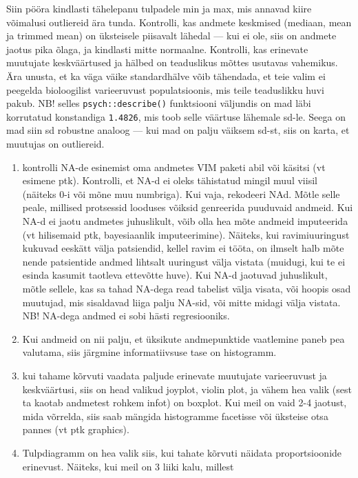 \documentclass[]{book}
\begin{document}
Siin pööra kindlasti tähelepanu tulpadele min ja max, mis annavad kiire
võimalusi outliereid ära tunda. Kontrolli, kas andmete keskmised
(mediaan, mean ja trimmed mean) on üksteisele piisavalt lähedal --- kui
ei ole, siis on andmete jaotus pika õlaga, ja kindlasti mitte normaalne.
Kontrolli, kas erinevate muutujate keskväärtused ja hälbed on
teaduslikus mõttes usutavas vahemikus. Ära unusta, et ka väga väike
standardhälve võib tähendada, et teie valim ei peegelda bioloogilist
varieeruvust populatsioonis, mis teile teaduslikku huvi pakub. NB!
selles \texttt{psych::describe()} funktsiooni väljundis on mad läbi
korrutatud konstandiga \texttt{1.4826}, mis toob selle väärtuse lähemale
sd-le. Seega on mad siin sd robustne analoog --- kui mad on palju
väiksem sd-st, siis on karta, et muutujas on outliereid.

\begin{enumerate}
\def\labelenumi{\arabic{enumi}.}
\setcounter{enumi}{2}
\item
  kontrolli NA-de esinemist oma andmetes VIM paketi abil või käsitsi (vt
  esimene ptk). Kontrolli, et NA-d ei oleks tähistatud mingil muul
  viisil (näiteks 0-i või mõne muu numbriga). Kui vaja, rekodeeri NAd.
  Mõtle selle peale, millised protsessid looduses võiksid genreerida
  puuduvaid andmeid. Kui NA-d ei jaotu andmetes juhuslikult, võib olla
  hea mõte andmeid imputeerida (vt hilisemaid ptk, bayesiaanlik
  imputeerimine). Näiteks, kui ravimiuuringust kukuvad eeskätt välja
  patsiendid, kellel ravim ei tööta, on ilmselt halb mõte nende
  patsientide andmed lihtsalt uuringust välja vistata (muidugi, kui te
  ei esinda kasumit taotleva ettevõtte huve). Kui NA-d jaotuvad
  juhuslikult, mõtle sellele, kas sa tahad NA-dega read tabelist välja
  visata, või hoopis osad muutujad, mis sisaldavad liiga palju NA-sid,
  või mitte midagi välja vistata. NB! NA-dega andmed ei sobi hästi
  regresiooniks.
\item
  Kui andmeid on nii palju, et üksikute andmepunktide vaatlemine paneb
  pea valutama, siis järgmine informatiivsuse tase on histogramm.
\item
  kui tahame kõrvuti vaadata paljude erinevate muutujate varieeruvust ja
  keskväärtusi, siis on head valikud joyplot, violin plot, ja vähem hea
  valik (sest ta kaotab andmetest rohkem infot) on boxplot. Kui meil on
  vaid 2-4 jaotust, mida võrrelda, siis saab mängida histogramme
  facetisse või üksteise otsa pannes (vt ptk graphics).
\item
  Tulpdiagramm on hea valik siis, kui tahate kõrvuti näidata
  proportsioonide erinevust. Näiteks, kui meil on 3 liiki kalu, millest

\end{enumerate}
\end{document}
